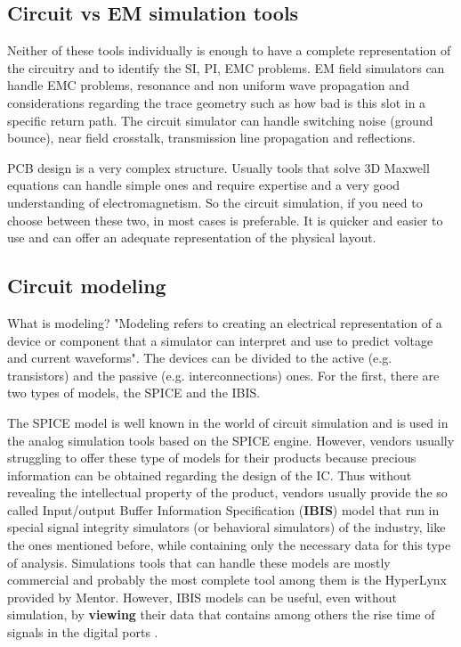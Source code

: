 \documentclass[final]{cubedoc}
\begin{document}
	\subsection{Circuit vs EM simulation tools}
	
	Neither of these tools individually is enough to have a complete representation of the circuitry and to identify the SI, PI, EMC problems. EM field simulators can handle EMC problems, resonance and non uniform wave propagation and considerations regarding the trace geometry such as how bad is this slot in a specific return path. The circuit simulator can handle switching noise (ground bounce), near field crosstalk, transmission line propagation and reflections.	
	
	PCB design is a very complex structure. Usually tools that solve 3D Maxwell equations can handle simple ones and require expertise and a very good understanding of electromagnetism. So the circuit simulation, if you need to choose between these two, in most cases is preferable. It is quicker and easier to use and can offer an adequate representation of the physical layout.
	
	
	\subsection{Circuit modeling}
	
	
	What is modeling? "Modeling refers to creating an electrical representation of a device or component that a simulator can interpret and use to predict voltage and current waveforms". The devices can be divided to the active (e.g. transistors) and the passive (e.g. interconnections) ones. For the first, there are two types of models, the SPICE and the IBIS.
	
	The SPICE model is well known in the world of circuit simulation and is used in the analog simulation tools based on the SPICE engine. However, vendors usually struggling to offer these type of models for their products because precious information can be obtained regarding the design of the IC. Thus without revealing the intellectual property of the product, vendors usually provide the so called Input/output Buffer Information Specification (\textbf{IBIS}) model that run in special signal integrity simulators (or behavioral simulators) of the industry, like the ones mentioned before, while containing only the necessary data for this type of analysis. Simulations tools that can handle these models are mostly commercial and probably the most complete tool among them is the HyperLynx provided by Mentor.
	However, IBIS models can be useful, even without simulation, by \textbf{viewing} their data that contains among others the rise time of signals in the digital ports \cite{bogatin2009signal}.
	
\end{document}
